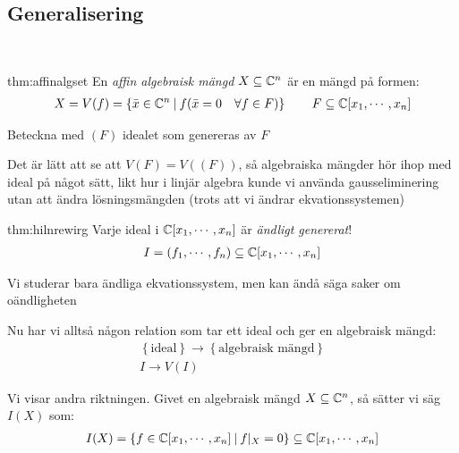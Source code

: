 \subsection{Generalisering}\hfill\\\par
\begin{theo}{thm:affinalgset}
  En \textit{affin algebraisk mängd} $X\subseteq \mathbb{C}^n$ är en mängd på formen:
  \begin{equation*}
    \begin{gathered}
      X = V(f) = \left\{\bar{x}\in\mathbb{C}^n\:|\: f(\bar{x}=0\quad\forall f\in F)\right\}\qquad F\subseteq\mathbb{C}[x_1,\cdots,x_n]
    \end{gathered}
  \end{equation*}\par
  \noindent Beteckna med $(F)$ idealet som genereras av $F$\par
  \noindent Det är lätt att se att $V(F) = V((F))$, så algebraiska mängder hör ihop med ideal på något sätt, likt hur i linjär algebra kunde vi använda gausseliminering utan att ändra lösningsmängden (trots att vi ändrar ekvationssystemen)
\end{theo}
\par\bigskip
\begin{theo}{thm:hilnrewirg}
  Varje ideal i $\mathbb{C}[x_1,\cdots,x_n]$ är \textit{ändligt genererat}!
  \begin{equation*}
    \begin{gathered}
      I =(f_1,\cdots,f_n)\subseteq\mathbb{C}[x_1,\cdots,x_n]
    \end{gathered}
  \end{equation*}\par
  \noindent Vi studerar bara ändliga ekvationssystem, men kan ändå säga saker om oändligheten
\end{theo}
\par\bigskip
\noindent Nu har vi alltså någon relation som tar ett ideal och ger en algebraisk mängd:
\begin{equation*}
  \begin{gathered}
    \left\{\text{ideal}\right\}\to\left\{\text{algebraisk mängd}\right\}\\
    I\to V(I)
  \end{gathered}
\end{equation*}\par
\noindent Vi visar andra riktningen. Givet en algebraisk mängd $X\subseteq \mathbb{C}^n$, så sätter vi säg $I(X)$ som:
\begin{equation*}
  \begin{gathered}
    I(X) = \left\{f\in\mathbb{C}[x_1,\cdots,x_n]\:|\: f|_X=0\right\}\subseteq\mathbb{C}[x_1,\cdots,x_n]
  \end{gathered}
\end{equation*}\par
